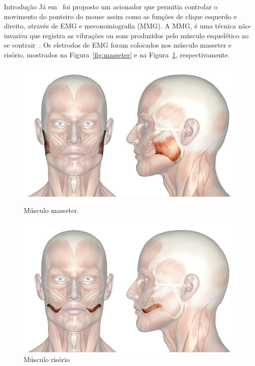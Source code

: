 \begin{chapter}{Introdução}
Já em~\cite{Kaushik12} foi proposto um acionador que permitia controlar o
movimento do ponteiro do mouse assim como as funções de clique esquerdo e
direito, através de EMG e meconomiografia (MMG). A MMG, é uma técnica
não-invasiva que registra as vibrações ou sons produzidos pelo músculo
esquelético ao se contrair~\cite{Vaz99}. Os eletrodos de EMG foram colocados nos
músculo masseter e risório, mostrados na Figura~\ref{fig:masseter} e na
Figura~\ref{fig:risorio}, respectivamente. %
\begin{figure}[H]
    \centering
    \begin{minipage}{.5\textwidth}
        \centering
        \includegraphics[width=0.9\linewidth, height=0.2\textheight]{fig/masseter}
        \caption{Músculo masseter.}
        \label{fig:masseter}
    \end{minipage}%
    \begin{minipage}{0.5\textwidth}
        \centering
        \includegraphics[width=0.91\linewidth, height=0.2\textheight]{fig/risorio}
        \caption{Músculo risório}
        \label{fig:risorio}
    \end{minipage}

\end{figure}
\end{chapter}
